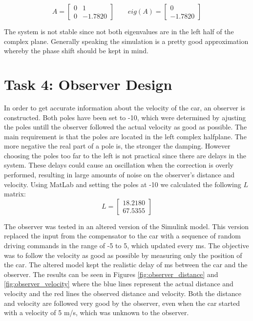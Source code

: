 \documentclass[final]{scrreprt} %
\begin{document}
\begin{equation}
A=
\begin{bmatrix}
  0 & 1 \\
  0 & -1.7820
 \end{bmatrix}
\qquad
eig(A)=
\begin{bmatrix}
   0 \\
  -1.7820
 \end{bmatrix}
\end{equation}

The system is not stable since not both eigenvalues are in the left half of the complex plane.
Generally speaking the simulation is a pretty good approximation whereby the phase shift should be kept in mind.

\section*{Task 4: Observer Design}
In order to get accurate information about the velocity of the car, an observer is constructed.
Both poles have been set to -10, which were determined by ajusting the poles untill the observer followed the actual velocity as good as possible.
The main requirement is that the poles are located in the left complex halfplane.
The more negative the real part of a pole is, the stronger the damping.
However choosing the poles too far to the left is not practical since there are delays in the system.
These delays could cause an oscillation when the correction is overly performed, resulting in large amounts of noise on the observer's distance and velocity.
Using MatLab and setting the poles at -10 we calculated the following $L$ matrix:
\begin{equation}
L=
\begin{bmatrix}
  18.2180 \\
  67.5355
 \end{bmatrix}
\end{equation}

The observer was tested in an altered version of the Simulink model.
This version replaced the input from the compensator to the car with a sequence of random driving commands in the range of -5 to 5, which updated every \unit[100]{ms}.
The objective was to follow the velocity as good as possible by measuring only the position of the car.
The altered model kept the realistic delay of \unit[50]{ms} between the car and the observer.
The results can be seen in Figures \ref{fig:observer_distance} and \ref{fig:observer_velocity} where the blue lines represent the actual distance and velocity and the red lines the observed distance and velocity.
Both the distance and velocity are followed very good by the observer, even when the car started with a velocity of 5 m/s, which was unknown to the observer.
\end{document}
